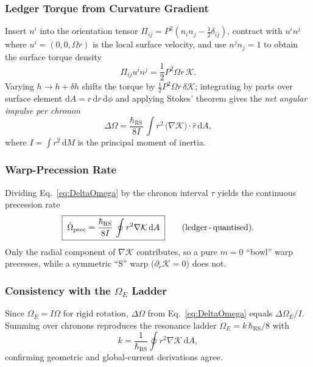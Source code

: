 \documentclass[11pt,oneside]{book}
\begin{document}
\subsubsection{Ledger Torque from Curvature Gradient}
\label{ss:warp-torque}

Insert $n^{i}$ into the orientation tensor
$\Pi_{ij}=P^{2}(n_{i}n_{j}-\tfrac12\delta_{ij})$,
contract with $u^{i}n^{j}$ where
$u^{i}=(0,0,\Omega r)$ is the local surface velocity, and use
$n^{j}n_{j}=1$ to obtain the surface torque density
\[
   \Pi_{ij}u^{i}n^{j}
   = \frac12 P^{2}\Omega r\,\mathcal K.
\]
Varying $h\!\to\!h+\delta h$ shifts the torque by
$\frac12P^{2}\Omega r\,\delta\mathcal K$; integrating by parts over
surface element $\mathrm dA=r\,\mathrm dr\,\mathrm d\phi$ and applying
Stokes’ theorem gives the \emph{net angular impulse per chronon}
\begin{equation}
   \Delta\Omega
   =  \frac{\hbar_{\mathrm{RS}}}{8I}\,
      \int \! r^{2}\,
      \bigl(\nabla\mathcal K\bigr)\cdot\hat r\,
      \mathrm dA,
   \label{eq:DeltaOmega}
\end{equation}
where $I=\int r^{2}\,\mathrm dM$ is the principal moment of inertia.

\subsubsection{Warp-Precession Rate}
\label{ss:warp-rate}

Dividing Eq.~\eqref{eq:DeltaOmega} by the chronon interval $\tau$
yields the continuous precession rate
\begin{equation}
   \boxed{\;
      \dot{\Omega}_{\mathrm{prec}}
      = \frac{\hbar_{\mathrm{RS}}}{8I}\,
        \oint r^{2} \nabla\mathcal K \,\mathrm dA
      \;}
   \qquad
   (\text{led\-ger\,-\,quantised}).
   \label{eq:warp-rate}
\end{equation}
Only the radial component of $\nabla\mathcal K$ contributes, so a
pure $m=0$ “bowl” warp precesses, while a symmetric “S” warp
($\partial_{r}\mathcal K = 0$) does not.

\subsubsection{Consistency with the $\Omega_{E}$ Ladder}
\label{ss:warp-consistency}

Since $\Omega_{E}=I\Omega$ for rigid rotation,
$\Delta\Omega$ from Eq.~\eqref{eq:DeltaOmega} equals
$\Delta\Omega_{E}/I$.  
Summing over chronons reproduces the resonance ladder
$\dot\Omega_{E}=k\,\hbar_{\mathrm{RS}}/8$ with
\[
   k
   = \frac{1}{\hbar_{\mathrm{RS}}}
       \oint r^{2}\nabla\mathcal K\,\mathrm dA,
\]
confirming geometric and global-current derivations agree.
\end{document}
